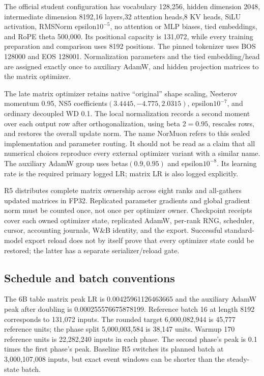 The official student configuration has vocabulary 128,256, hidden dimension 2048, intermediate dimension 8192,16 layers,32 attention heads,8 KV heads, SiLU activation, RMSNorm epsilon$10^{-5}$, no attention or MLP biases, tied embeddings, and RoPE theta 500,000. Its positional capacity is 131,072, while every training preparation and comparison uses 8192 positions. The pinned tokenizer uses BOS 128000 and EOS 128001. Normalization parameters and the tied embedding/head are assigned exactly once to auxiliary AdamW, and hidden projection matrices to the matrix optimizer.

The late matrix optimizer retains native ``original'' shape scaling, Nesterov momentum 0.95, NS5 coefficients$(3.4445,-4.775,2.0315)$, epsilon$10^{-7}$, and ordinary decoupled WD 0.1. The local normalization records a second moment over each output row after orthogonalization, using beta 2$=0.95$, rescales rows, and restores the overall update norm. The name NorMuon refers to this sealed implementation and parameter routing. It should not be read as a claim that all numerical choices reproduce every external optimizer variant with a similar name. The auxiliary AdamW group uses betas$(0.9,0.95)$ and epsilon$10^{-8}$. Its learning rate is the required primary logged LR; matrix LR is also logged explicitly.

R5 distributes complete matrix ownership across eight ranks and all-gathers updated matrices in FP32. Replicated parameter gradients and global gradient norm must be counted once, not once per optimizer owner. Checkpoint receipts cover each owned optimizer state, replicated AdamW, per-rank RNG, scheduler, cursor, accounting journals, W\&B identity, and the export. Successful standard-model export reload does not by itself prove that every optimizer state could be restored; the latter has a separate serializer/reload gate.

\subsection{Schedule and batch conventions}

The 6B table matrix peak LR is 0.00425961126463665 and the auxiliary AdamW peak after doubling is 0.000255576675878199. Reference batch 16 at length 8192 corresponds to 131,072 inputs. The rounded target 6,000,082,944 is 45,777 reference units; the phase split 5,000,003,584 is 38,147 units. Warmup 170 reference units is 22,282,240 inputs in each phase. The second phase's peak is 0.1 times the first phase's peak. Baseline R5 switches its planned batch at 3,000,107,008 inputs, but exact event windows can be shorter than the steady-state batch.

